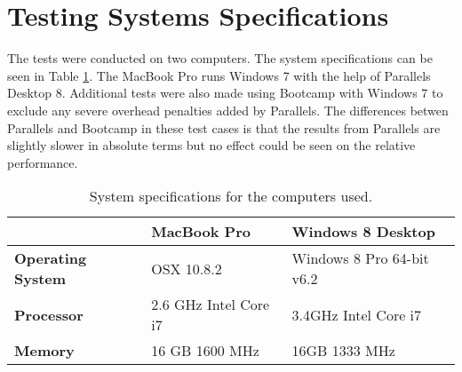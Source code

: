 \section{Testing Systems Specifications} \label{sec:system_specs}
The tests were conducted on two computers. The system specifications can be seen in Table \ref{table:system_specs}. The MacBook Pro runs Windows 7 with the help of Parallels Desktop 8. Additional tests were also made using Bootcamp with Windows 7 to exclude any severe overhead penalties added by Parallels. The differences betwen Parallels and Bootcamp in these test cases is that the results from Parallels are slightly slower in absolute terms but no effect could be seen on the relative performance.

\begin{table}[h]
	\begin{center}
		\begin{tabular} { m{4cm} | m{4cm}  | m{5cm} }
			\hline
			\textbf{} & \textbf{MacBook Pro} &
			\textbf{Windows 8 Desktop}  \\ \hline

			\textbf{Operating System}		& OSX 10.8.2
											& Windows 8 Pro 64-bit v6.2 \\ \hline

			\textbf{Processor}				& 2.6 GHz Intel Core i7
											& 3.4GHz Intel Core i7  \\ \hline

			\textbf{Memory}					& 16 GB 1600 MHz
											& 16GB 1333 MHz \\ \hline
		\end{tabular}
	\end{center}
	\caption{System specifications for the computers used.}
	\label{table:system_specs}
\end{table}
